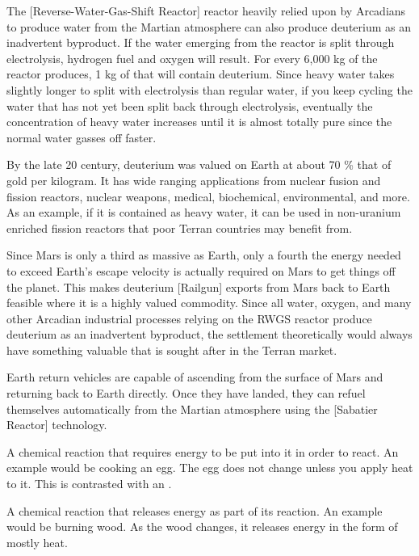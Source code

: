 The [Reverse-Water-Gas-Shift Reactor] reactor heavily relied upon by Arcadians to produce water from the Martian atmosphere can also produce deuterium as an inadvertent byproduct. If the water emerging from the reactor is split through electrolysis, hydrogen fuel and oxygen will result. For every 6,000 kg of  the reactor produces, 1 kg of that will contain deuterium. Since heavy water takes slightly longer to split with electrolysis than regular water, if you keep cycling the water that has not yet been split back through electrolysis, eventually the concentration of heavy water increases until it is almost totally pure since the normal water gasses off faster.

By the late 20 century, deuterium was valued on Earth at about 70 \% that of gold per kilogram. It has wide ranging applications from nuclear fusion and fission reactors, nuclear weapons, medical, biochemical, environmental, and more. As an example, if it is contained as heavy water, it can be used in non-uranium enriched fission reactors that poor Terran countries may benefit from.

Since Mars is only a third as massive as Earth, only a fourth the energy needed to exceed Earth's escape velocity is actually required on Mars to get things off the planet. This makes deuterium [Railgun] exports from Mars back to Earth feasible where it is a highly valued commodity. Since all water, oxygen, and many other Arcadian industrial processes relying on the RWGS reactor produce deuterium as an inadvertent byproduct, the settlement theoretically would always have something valuable that is sought after in the Terran market.
\stopdefinition

Earth return vehicles are capable of ascending from the surface of Mars and returning back to Earth directly. Once they have landed, they can refuel themselves automatically from the Martian atmosphere using the [Sabatier Reactor] technology.
\stopdefinition

A chemical reaction that requires energy to be put into it in order to react. An example would be cooking an egg. The egg does not change unless you apply heat to it. This is contrasted with an .
\stopdefinition

A chemical reaction that releases energy as part of its reaction. An example would be burning wood. As the wood changes, it releases energy in the form of mostly heat.
\stopdefinition

